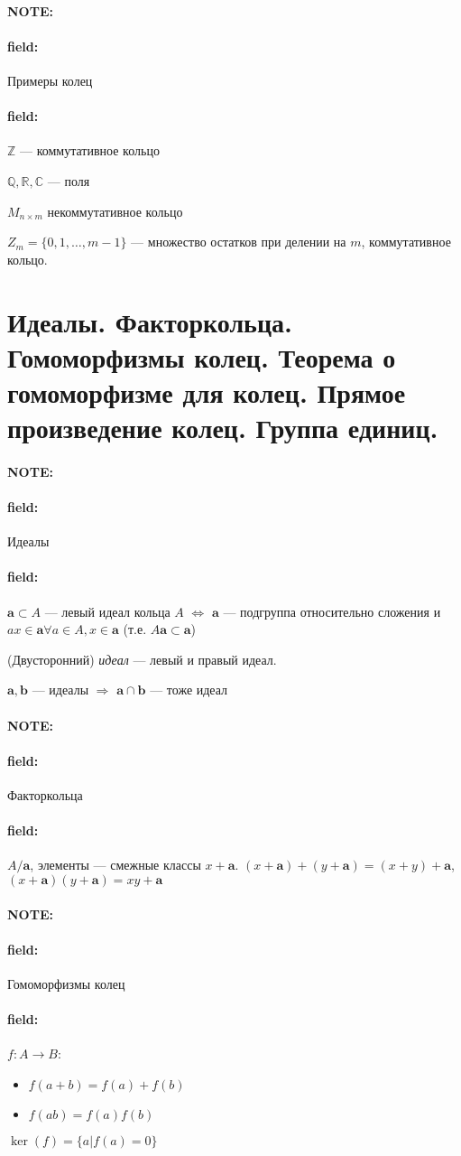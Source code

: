 \documentclass[12pt]{article}
\newenvironment{note}{\paragraph{NOTE:}}{}
\newenvironment{field}{\paragraph{field:}}{}
\begin{document}
\begin{note}
  \begin{field}
    Примеры колец
  \end{field}
  \begin{field}
    $\mathbb{Z}$ --- коммутативное кольцо

    $\mathbb{Q}, \mathbb{R}, \mathbb{C}$ --- поля

    $M_{n \times m}$ некоммутативное кольцо

    $Z_{m} = \{0, 1, \ldots, m-1\}$ --- множество остатков при делении на $m$,
    коммутативное кольцо.
  \end{field}
\end{note}

\section{Идеалы. Факторкольца. Гомоморфизмы колец. Теорема о гомоморфизме для
колец. Прямое произведение колец. Группа единиц.}

\begin{note}
  \begin{field}
    Идеалы
  \end{field}
  \begin{field}
    $\mathbf{a} \subset A$ --- левый идеал кольца $A$
    $\Leftrightarrow$
    $\mathbf{a}$ --- подгруппа относительно сложения и
    $ax \in \mathbf{a} \forall a \in A, x \in \mathbf{a}$
    (т.е. $A\mathbf{a} \subset \mathbf{a}$)

    (Двусторонний) \emph{идеал} --- левый и правый идеал.

    $\mathbf{a}, \mathbf{b}$ --- идеалы $\Rightarrow$ $\mathbf{a} \cap \mathbf{b}$ --- тоже идеал
  \end{field}
\end{note}

\begin{note}
  \begin{field}
    Факторкольца
  \end{field}
  \begin{field}
    $A/\mathbf{a}$, элементы --- смежные классы $x + \mathbf{a}$.
    $(x + \mathbf{a})+(y + \mathbf{a}) = (x + y)+\mathbf{a}$,
    $(x + \mathbf{a})(y + \mathbf{a}) = xy+\mathbf{a}$
  \end{field}
\end{note}

\begin{note}
  \begin{field}
    Гомоморфизмы колец
  \end{field}
  \begin{field}
    $f : A \rightarrow B$:
    \begin{itemize}
      \item
      $f(a + b) = f(a) + f(b)$
      \item
      $f(ab) = f(a)f(b)$
    \end{itemize}

    $\ker(f) = \{a | f(a) = 0\}$
  \end{field}
\end{note}
\end{document}
